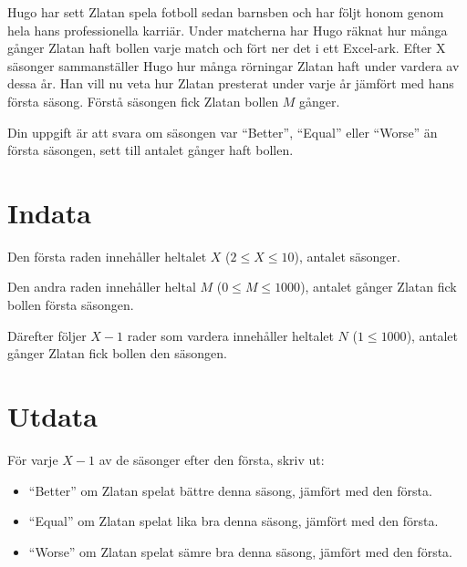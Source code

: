 Hugo har sett Zlatan spela fotboll sedan barnsben och har följt honom genom hela hans
professionella karriär. Under matcherna har Hugo räknat hur många gånger Zlatan haft bollen
varje match och fört ner det i ett Excel-ark. Efter X säsonger sammanställer Hugo hur
många rörningar Zlatan haft under vardera av dessa år. Han vill nu veta hur Zlatan presterat
under varje år jämfört med hans första säsong. Förstå säsongen fick Zlatan bollen $M$ gånger.

Din uppgift är att svara om säsongen var ``Better'', ``Equal'' eller ``Worse'' än första säsongen,
sett till antalet gånger haft bollen.

\section*{Indata}
Den första raden innehåller heltalet $X$ ($2 \leq X \leq 10$), antalet säsonger.

Den andra raden innehåller heltal $M$ ($0 \leq M \leq 1000$), antalet gånger Zlatan fick
bollen första säsongen.

Därefter följer $X-1$ rader som vardera innehåller heltalet $N$ ($1 \leq 1000$), antalet
gånger Zlatan fick bollen den säsongen.

\section*{Utdata}
För varje $X-1$ av de säsonger efter den första, skriv ut:
\begin{itemize}
    \item ``Better'' om Zlatan spelat bättre denna säsong, jämfört med den första.
    \item ``Equal'' om Zlatan spelat lika bra denna säsong, jämfört med den första.
    \item ``Worse'' om Zlatan spelat sämre bra denna säsong, jämfört med den första.
\end{itemize}
